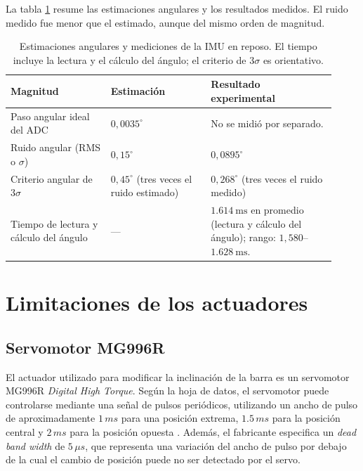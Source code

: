 \documentclass[a4paper, twoside, 10pt, spanish]{article}
\numberwithin{table}{section}
\begin{document}
La tabla \ref{tab:imu_comparacion} resume las estimaciones angulares y los resultados medidos. El ruido medido fue menor que el estimado, aunque del mismo orden de magnitud.

\begin{table}[H]
    \centering
    \small
    \begin{tabular}{@{}p{0.28\linewidth}p{0.29\linewidth}p{0.35\linewidth}@{}}
        \toprule
        Magnitud & Estimación & Resultado experimental \\
        \midrule
        Paso angular ideal del ADC & $0{,}0035^\circ$ & No se midió por separado. \\
        \addlinespace
        Ruido angular (RMS o $\sigma$) & $0{,}15^\circ$ & $0{,}0895^\circ$ \\
        \addlinespace
        Criterio angular de $3\sigma$ & $0{,}45^\circ$ (tres veces el ruido estimado) & $0{,}268^\circ$ (tres veces el ruido medido) \\
        \addlinespace
        Tiempo de lectura y cálculo del ángulo & --- & $\SI{1,614}{\milli\second}$ en promedio (lectura y cálculo del ángulo); rango: $1{,}580$--$\SI{1,628}{\milli\second}$. \\
        \bottomrule
    \end{tabular}
    \caption{Estimaciones angulares y mediciones de la IMU en reposo. El tiempo incluye la lectura y el cálculo del ángulo; el criterio de $3\sigma$ es orientativo.}
    \label{tab:imu_comparacion}
\end{table}

\section{Limitaciones de los actuadores}


\subsection{Servomotor MG996R}

El actuador utilizado para modificar la inclinación de la barra es un
servomotor MG996R \textit{Digital High Torque}. Según la hoja de datos, el
servomotor puede controlarse mediante una señal de pulsos periódicos,
utilizando un ancho de pulso de aproximadamente $1\,ms$ para una posición
extrema, $1.5\,ms$ para la posición central y $2\,ms$ para la posición
opuesta \cite{mg996r}. Además, el fabricante especifica un \textit{dead
band width} de $5\,\mu s$, que representa una variación del ancho de pulso
por debajo de la cual el cambio de posición puede no ser detectado por el
servo.
\end{document}
